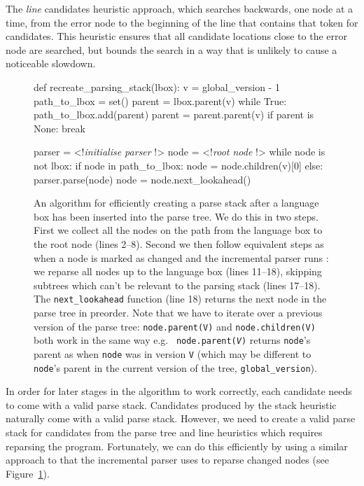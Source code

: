 \documentclass[sigplan,screen]{acmart}\settopmatter{printfolios=true,printccs=false,printacmref=false}
\begin{document}
The \emph{line} candidates heuristic approach, which searches
backwards, one node at a time, from the error node to the beginning of the line
that contains that token for candidates. This heuristic ensures that all
candidate locations close to the error node are searched, but bounds the search
in a way that is unlikely to cause a noticeable slowdown.

\begin{figure}
\begin{lstdefault}[]
def recreate_parsing_stack(lbox):
  v = global_version - 1
  path_to_lbox = set()
  parent = lbox.parent(v)
  while True:
    path_to_lbox.add(parent)
    parent = parent.parent(v)
    if parent is None:
      break

  parser = <!\textrm{\textit{initialise parser}} !>
  node = <!\textrm{\textit{root node}} !>
  while node is not lbox:
    if node in path_to_lbox:
      node = node.children(v)[0]
    else:
      parser.parse(node)
      node = node.next_lookahead()
\end{lstdefault}
\caption{An algorithm for efficiently creating a parse stack after a language box
has been inserted into the parse tree. We do this in two steps. First we
collect all the nodes on the path from the language box to the root node (lines
2--8). Second we then follow equivalent steps as when a node is marked as
changed and the incremental parser runs \cite[p.~63]{wagner98practicalalgorithms}:
we reparse all nodes up to the language box (lines 11--18), skipping
subtrees which can't be relevant to the parsing stack (lines 17--18). The
\texttt{next\_lookahead} function (line 18) returns the next node in the parse
tree in preorder. Note that we have to iterate over a previous version of the
parse tree: \texttt{node.parent(V)} and \texttt{node.children(V)} both work in
the same way e.g.~ \texttt{node.parent(\textit{V})} returns \texttt{node}'s
parent as when \texttt{node} was in version \texttt{V} (which may be
different to \texttt{node}'s parent in the current version of the tree,
\texttt{global\_version}).}
\label{fig:createparsestack}
\end{figure}

In order for later stages in the algorithm to work correctly, each candidate
needs to come with a valid parse stack. Candidates produced by the stack
heuristic naturally come with a valid parse stack. However, we need to create a
valid parse stack for candidates from the parse tree and line heuristics which
requires reparsing the program. Fortunately, we can do this efficiently by
using a similar approach to that the incremental parser uses to reparse changed
nodes (see Figure~\ref{fig:createparsestack}).
\end{document}

